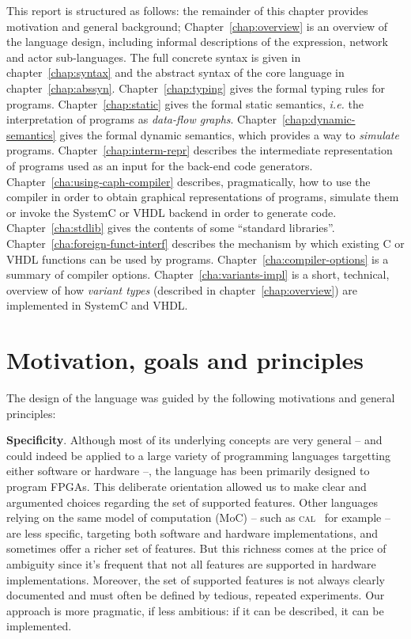 \medskip This report is structured as follows: the remainder of this chapter provides motivation and
general background; Chapter~\ref{chap:overview} is an overview of the \caph language design,
including informal descriptions of the expression, network and actor sub-languages. The full
concrete syntax is given in chapter~\ref{chap:syntax} and the abstract syntax of the core language
in chapter~\ref{chap:abssyn}. Chapter~\ref{chap:typing} gives the formal typing rules for \caph
programs. Chapter~\ref{chap:static} gives the formal static semantics,
\emph{i.e.} the interpretation of \caph programs as \emph{data-flow graphs}.
Chapter~\ref{chap:dynamic-semantics} gives the formal dynamic semantics, which provides a way to
\emph{simulate} \caph programs.  Chapter~\ref{chap:interm-repr} describes
  the intermediate representation of \caph programs used as an input for the back-end code
  generators. Chapter~\ref{cha:using-caph-compiler} describes, pragmatically, how to use the
compiler in order to obtain graphical representations of programs, simulate them or invoke the
SystemC or VHDL backend in order to generate code. Chapter~\ref{cha:stdlib} gives the contents of
some ``standard libraries''. Chapter~\ref{cha:foreign-funct-interf} describes
the mechanism by which existing C or VHDL functions can be used by \caph
programs. Chapter~\ref{cha:compiler-options} is a summary of compiler options.
 Chapter~\ref{cha:variants-impl} is a short, technical, overview of how \emph{variant
  types} (described in chapter~\ref{chap:overview}) are implemented in SystemC and VHDL. 

\clearpage

\section{Motivation, goals and principles}

The design of the \caph language was guided by the following motivations and general principles:

\medskip \textbf{Specificity}. Although most of its underlying concepts are very general -- and
could indeed be applied to a large variety of programming languages targetting either software or
hardware --, the \caph language has been primarily designed to program FPGAs. This deliberate
orientation allowed us to make clear and argumented choices regarding the set of supported
features.
Other languages relying on the same model of computation (MoC) -- such as \textsc{cal}~\cite{CAL}
for example -- are less specific, targeting both software and hardware implementations, and
sometimes offer a richer set of features. But this richness comes at the price of ambiguity
since it's frequent that not all features are supported in hardware implementations. Moreover, the
set of supported features is not always clearly documented and must often be defined by tedious,
repeated experiments. Our approach is more pragmatic, if less ambitious: if it can be described, it
can be implemented.

